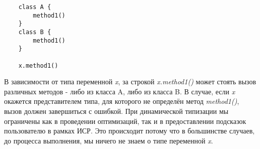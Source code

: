 \vskip4pt

\begin{verbatim}
    class A {
        method1()
    }
    class B {
        method1()
    }

    x.method1()
\end{verbatim} 

\vskip4pt


В зависимости от типа переменной \textit{x}, за строкой \textit{x.method1()} может стоять вызов различных методов - либо из класса A, либо из класса B. В случае, если \textit{x} окажется представителем типа, для которого не определён метод \textit{method1()}, вызов должен завершиться с ошибкой. При динамической типизации мы ограничены как в проведении оптимизаций, так и в предоставлении подсказок пользователю в рамках ИСР. Это происходит потому что в большинстве случаев, до процесса выполнения, мы ничего не знаем о типе переменной \textit{x}.


